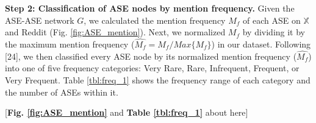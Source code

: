 \documentclass[referee,bst/sn-basic]{sn-jnl}%
\begin{document}
\begin{comment}

 \begin{figure}
    \centering
    \texttt{[image: images/graph.pdf]}
    \caption{The ASE-ASE network $G$ based on social media posts.
    }
    \label{fig:graph}
\end{figure}

\end{comment}


\textbf{Step 2: Classification of ASE nodes by mention frequency.}
Given the ASE-ASE network $G$, we calculated the mention frequency $M_f$ of each ASE on $\mathbb{X}$ and Reddit (Fig. \ref{fig:ASE_mention}).
Next, we normalized $M_f$ by dividing it by the maximum mention frequency ($\hat{M_f} = M_f/Max\{M_f\}$) in our dataset. 
Following [24], 
we then classified every ASE node by its normalized mention frequency ($\hat{M_f}$) into one of five frequency categories: Very Rare, Rare, Infrequent, Frequent, or Very Frequent.
Table \ref{tbl:freq_1} shows the frequency range of each category and the number of ASEs within it.


\begin{center}
    [\textbf{Fig. \ref{fig:ASE_mention}} and \textbf{Table \ref{tbl:freq_1}}  about here]
\end{center}

\begin{comment}
\begin{sidewaysfigure}
    \centering
    \texttt{[image: images/side\_effect\_distribution.pdf]}
    \caption{Long-tailed distribution of ASEs as aggregated groups by frequency of mentions on Reddit and $\mathbb{X}$.
             }
    \label{fig:ASE_mention}
\end{sidewaysfigure}

\end{comment}


\begin{comment}
\begin{table}[h]
    \centering
    \caption{Categories of adverse side effects (ASEs) by normalized mention frequency ($\hat{M_f}$) on social media.}
    \label{tbl:freq_1}
    \begin{tabular}{llll}
    \toprule
    Category   &  Range & Number of ASEs\\
    \midrule
      Very Rare   &  $\hat{M_f} < 0.0001$ & 0 \\
      Rare   & $  0.0001 \leq \hat{M_f} < 0.001$  & 0 \\
      Infrequent   & $ 0.001 \leq \hat{M_f} < 0.01$ & 42 \\
      Frequent   & $0.01 \leq \hat{M_f} < 0.1$ & 24 \\
      Very Frequent   & $\hat{M_f} \geq  0.1$ & 12 \\
    \bottomrule
    \end{tabular}
\end{table}
\end{comment}
\end{document}
